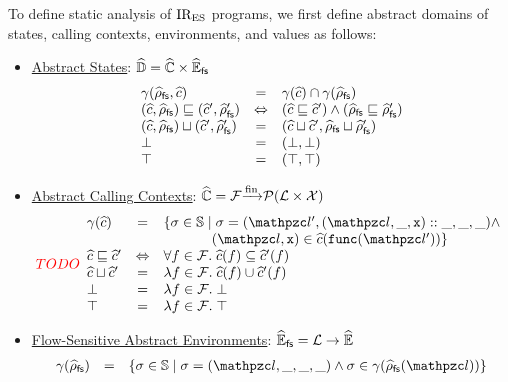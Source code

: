 To define static analysis of $\text{IR}_\text{ES}$ programs, we first define abstract domains
of states, calling contexts, environments, and values as follows:
\begin{itemize}
  \item \underline{Abstract States}:
    $\widehat{\mathbb{D}} = \widehat{\mathbb{C}} \times \widehat{\mathbb{E}}_{\textsf{fs}}$
    \[
      \begin{array}{lcl}
        \gamma(\widehat{\rho}_{\textsf{fs}}, \widehat{c}) &=& \gamma(\widehat{c}) \cap
        \gamma(\widehat{\rho}_{\textsf{fs}})\\

        (\widehat{c}, \widehat{\rho}_{\textsf{fs}}) \sqsubseteq (\widehat{c}', \widehat{\rho}_{\textsf{fs}}') &\Leftrightarrow&
        (\widehat{c} \sqsubseteq \widehat{c}') \wedge (\widehat{\rho}_{\textsf{fs}} \sqsubseteq \widehat{\rho}_{\textsf{fs}}')\\

        (\widehat{c}, \widehat{\rho}_{\textsf{fs}}) \sqcup (\widehat{c}', \widehat{\rho}_{\textsf{fs}}') &=&
        (\widehat{c} \sqcup \widehat{c}', \widehat{\rho}_{\textsf{fs}} \sqcup \widehat{\rho}_{\textsf{fs}}')\\

        \bot &=& (\bot, \bot)\\

        \top &=& (\top, \top)\\
      \end{array}
    \]

  \item \underline{Abstract Calling Contexts}:
    $\widehat{\mathbb{C}} = \mathcal{F} {\xrightarrow[]{\text{fin}}} \mathcal{P}(\mathcal{L} \times \mathcal{X})$
    \[
      \todo
      \begin{array}{lcl}
        \gamma(\actxt) &=& \{ \st \in \stset \mid
          \st = (\lab', (\lab, \_, \varx) :: \_, \_, \_) \wedge \\&&
          \phantom{\{ \st \in \stset \mid} (\lab, \varx) \in
            \actxt(\getfunc(\lab'))
        \}\\

        \actxt \order \actxt' &\Leftrightarrow&
        \forall \func \in \funcset. \; \actxt(\func) \subseteq \actxt'(\func)\\

        \actxt \join \actxt' &=&
        \lambda \func \in \funcset. \; \actxt(\func) \cup \actxt'(\func)\\

        \bot &=& \lambda \func \in \funcset. \; \bot\\

        \top &=& \lambda \func \in \funcset. \; \top\\
      \end{array}
    \]

  \item \underline{Flow-Sensitive Abstract Environments}:
    $\widehat{\mathbb{E}}_{\textsf{fs}} = \mathcal{L} \rightarrow \widehat{\mathbb{E}}$
    \[
      \begin{array}{lcl}
        \gamma(\afsenv) &=& \{ \st \in \stset \mid
          \st = (\lab, \_, \_, \_) \wedge \st \in \gamma(\afsenv(\lab))
        \}\\


\end{array}\]
\end{itemize}
